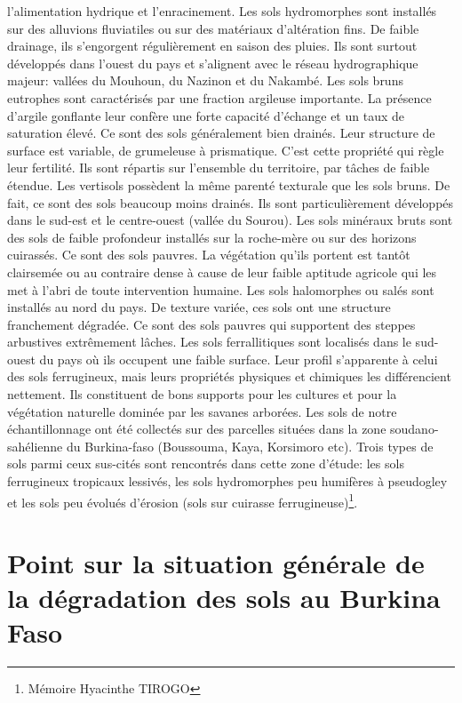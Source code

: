\documentclass[a4paper,11pt]{article}
\begin{document}
l’alimentation hydrique et l’enracinement. Les sols hydromorphes sont
installés sur des alluvions fluviatiles ou sur des matériaux
d’altération fins. De faible drainage, ils s’engorgent régulièrement
en saison des pluies. Ils sont surtout développés dans l’ouest du pays
et s’alignent avec le réseau hydrographique majeur: vallées du
Mouhoun, du Nazinon et du Nakambé. Les sols bruns eutrophes sont
caractérisés par une fraction argileuse importante. La présence
d’argile gonflante leur confère une forte capacité d’échange et un
taux de saturation élevé. Ce sont des sols généralement bien
drainés. Leur structure de surface est variable, de grumeleuse à
prismatique. C’est cette propriété qui règle leur fertilité. Ils sont
répartis sur l’ensemble du territoire, par tâches de faible
étendue. Les vertisols possèdent la même parenté texturale que les
sols bruns. De fait, ce sont des sols beaucoup moins drainés. Ils sont
particulièrement développés dans le sud-est et le centre-ouest (vallée
du Sourou). Les sols minéraux bruts sont des sols de faible profondeur
installés sur la roche-mère ou sur des horizons cuirassés. Ce sont des
sols pauvres. La végétation qu’ils portent est tantôt clairsemée ou au
contraire dense à cause de leur faible aptitude agricole qui les met à
l’abri de toute intervention humaine. Les sols halomorphes ou salés
sont installés au nord du pays. De texture variée, ces sols ont une
structure franchement dégradée. Ce sont des sols pauvres qui
supportent des steppes arbustives extrêmement lâches. Les sols
ferrallitiques sont localisés dans le sud-ouest du pays où ils
occupent une faible surface. Leur profil s’apparente à celui des sols
ferrugineux, mais leurs propriétés physiques et chimiques les
différencient nettement. Ils constituent de bons supports pour les
cultures et pour la végétation naturelle dominée par les savanes
arborées. Les sols de notre échantillonnage ont été collectés sur des
parcelles situées dans la zone soudano-sahélienne du Burkina-faso
(Boussouma, Kaya, Korsimoro etc). Trois types de sols parmi ceux
sus-cités sont rencontrés dans cette zone d'étude: les sols
ferrugineux tropicaux lessivés, les sols hydromorphes peu humifères à
pseudogley et les sols peu évolués d'érosion (sols sur cuirasse
ferrugineuse)\footnote{Mémoire Hyacinthe TIROGO}.

\section{Point sur la situation générale de la dégradation des sols au Burkina Faso}
\end{document}
